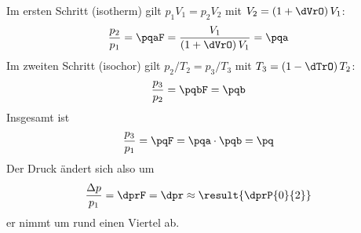 Im ersten Schritt (isotherm) gilt $p_1V_1 = p_2V_2$ mit $V_2 = \left(1+\dVrO\right)V_1$:
\begin{align}
 \frac{p_2}{p_1} &= \pqaF = \frac{V_1}{\left(1+\dVrO\right)V_1} = \pqa
\end{align}
Im zweiten Schritt (isochor) gilt $p_2/T_2 = p_3/T_3$ mit $T_3 = \left(1-\dTrO\right)T_2$:
\begin{align}
 \frac{p_3}{p_2} &= \pqbF = \pqb
\end{align}
Insgesamt ist
\begin{align}
 \frac{p_3}{p_1} &= \pqF = \pqa\cdot\pqb = \pq
\end{align}
Der Druck ändert sich also um
\begin{align}
 \frac{\Delta p}{p_1} &= \dprF = \dpr \approx \result{\dprP{0}{2}}
\end{align}
er nimmt um rund einen Viertel ab.
